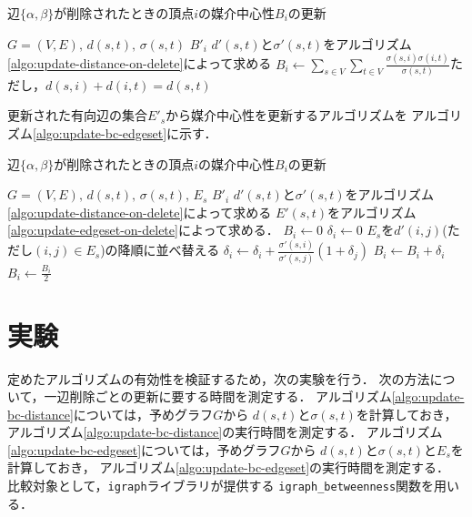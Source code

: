 \documentclass{jarticle}
\begin{document}
\begin{algorithm}[H]
  \caption{辺$\{\alpha,\beta\}$が削除されたときの頂点$i$の媒介中心性$B_i$の更新}
  \label{algo:update-bc-distance}
  \begin{algorithmic}[1]
    \Require $G=(V,E),\,d(s,t),\,\sigma(s,t)$
    \Ensure $B'_i$
    \State $d'(s,t)$と$\sigma'(s,t)$をアルゴリズム\ref{algo:update-distance-on-delete}によって求める
    \State $B_i\gets\sum_{s\in V}\sum_{t\in V}\frac{\sigma(s,i)\sigma(i,t)}{\sigma(s,t)}$ただし，$d(s,i)+d(i,t)=d(s,t)$
  \end{algorithmic}
\end{algorithm}

更新された有向辺の集合$E'_s$から媒介中心性を更新するアルゴリズムを
アルゴリズム\ref{algo:update-bc-edgeset}に示す．

\begin{algorithm}[H]
  \caption{辺$\{\alpha,\beta\}$が削除されたときの頂点$i$の媒介中心性$B_i$の更新}
  \label{algo:update-bc-edgeset}
  \begin{algorithmic}[1]
    \Require $G=(V,E),\,d(s,t),\,\sigma(s,t),\,E_s$
    \Ensure $B'_i$
    \State $d'(s,t)$と$\sigma'(s,t)$をアルゴリズム\ref{algo:update-distance-on-delete}によって求める
    \State $E'(s,t)$をアルゴリズム\ref{algo:update-edgeset-on-delete}によって求める．
    \State $B_i\gets 0$
    \State $\delta_i\gets 0$
    \State $E_s$を$d'(i,j)$(ただし$(i,j)\in E_s$)の降順に並べ替える
    \State $\delta_i\gets\delta_i+\frac{\sigma'(s,i)}{\sigma'(s,j)}(1+\delta_j)$
    \EndFor
    \State $B_i\gets B_i+\delta_i$
    \EndFor
    \State $B_i\gets\frac{B_i}{2}$
  \end{algorithmic}
\end{algorithm}

\section{実験}
定めたアルゴリズムの有効性を検証するため，次の実験を行う．
次の方法について，一辺削除ごとの更新に要する時間を測定する．
アルゴリズム\ref{algo:update-bc-distance}については，予めグラフ$G$から
$d(s,t)$と$\sigma(s,t)$を計算しておき，
アルゴリズム\ref{algo:update-bc-distance}の実行時間を測定する．
アルゴリズム\ref{algo:update-bc-edgeset}については，予めグラフ$G$から
$d(s,t)$と$\sigma(s,t)$と$E_s$を計算しておき，
アルゴリズム\ref{algo:update-bc-edgeset}の実行時間を測定する．
比較対象として，\verb|igraph|ライブラリが提供する
\verb|igraph_betweenness|関数を用いる．
\end{document}
